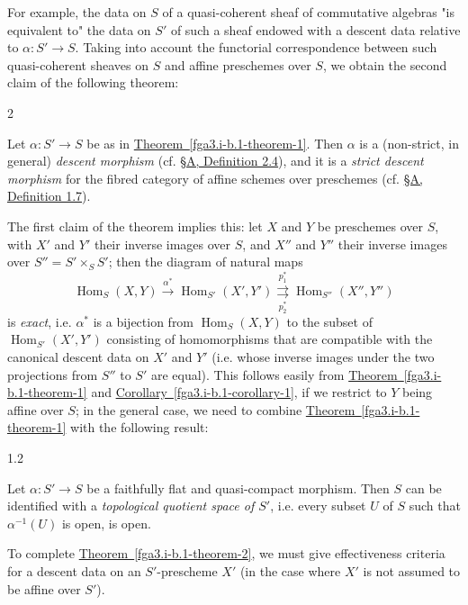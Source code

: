   For example, the data on \(S\) of a quasi-coherent sheaf of commutative algebras "is equivalent to" the data on \(S'\) of such a sheaf endowed with a descent data relative to \(\alpha \colon  S'\to  S\).
  Taking into account the functorial correspondence between such quasi-coherent sheaves on \(S\) and affine preschemes over \(S\), we obtain the second claim of the following theorem:\begin{theorem}{2}\label{fga3.i-b.1-theorem-2}\skipsinglepar\par{}Let \(\alpha \colon  S'\to  S\) be as in \hyperref[fga3.i-b.1-theorem-1]{Theorem~\ref*{fga3.i-b.1-theorem-1}}.
    Then \(\alpha \) is a (non-strict, in general) \emph{descent morphism} (cf. \hyperref[fga3.i-a.2-definition-2.4]{§A, Definition 2.4}), and it is a \emph{strict descent morphism} for the fibred category of affine schemes over preschemes (cf. \hyperref[fga3.i-a.1-definition-1.7]{§A, Definition 1.7}).\end{theorem}\par{}The first claim of the theorem implies this:
  let \(X\) and \(Y\) be preschemes over \(S\), with \(X'\) and \(Y'\) their inverse images over \(S\), and \(X''\) and \(Y''\) their inverse images over \(S''=S'\times _S S'\);
  then the diagram of natural maps
  \[     \operatorname {Hom}_S(X,Y) \xrightarrow {\alpha ^*}     \operatorname {Hom}_{S'}(X',Y') \overset {p_1^*}{\underset {p_2^*}{\rightrightarrows }}     \operatorname {Hom}_{S''}(X'',Y'')   \]
  is \emph{exact}, i.e. \(\alpha ^*\) is a bijection from \(\operatorname {Hom}_S(X,Y)\) to the subset of \(\operatorname {Hom}_{S'}(X',Y')\) consisting of homomorphisms that are compatible with the canonical descent data on \(X'\) and \(Y'\) (i.e. whose inverse images under the two projections from \(S''\) to \(S'\) are equal).
  This follows easily from \hyperref[fga3.i-b.1-theorem-1]{Theorem~\ref*{fga3.i-b.1-theorem-1}} and \hyperref[fga3.i-b.1-corollary-1]{Corollary~\ref*{fga3.i-b.1-corollary-1}}, if we restrict to \(Y\) being affine over \(S\);
  in the general case, we need to combine \hyperref[fga3.i-b.1-theorem-1]{Theorem~\ref*{fga3.i-b.1-theorem-1}} with the following result:\begin{lemma}{1.2}\label{fga3.i-b.1-lemma-1.2}\skipsinglepar\par{}Let \(\alpha \colon  S'\to  S\) be a faithfully flat and quasi-compact morphism.
    Then \(S\) can be identified with a \emph{topological quotient space of \(S'\)}, i.e. every subset \(U\) of \(S\) such that \(\alpha ^{-1}(U)\) is open, is open.\end{lemma}\par{}To complete \hyperref[fga3.i-b.1-theorem-2]{Theorem~\ref*{fga3.i-b.1-theorem-2}}, we must give effectiveness criteria for a descent data on an \(S'\)-prescheme \(X'\) (in the case where \(X'\) is not assumed to be affine over \(S'\)).
